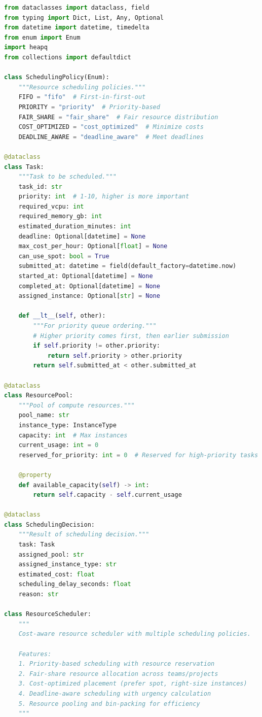 \begin{lstlisting}[language=Python, caption=ResourceScheduler with Cost-Aware Allocation]
from dataclasses import dataclass, field
from typing import Dict, List, Any, Optional
from datetime import datetime, timedelta
from enum import Enum
import heapq
from collections import defaultdict

class SchedulingPolicy(Enum):
    """Resource scheduling policies."""
    FIFO = "fifo"  # First-in-first-out
    PRIORITY = "priority"  # Priority-based
    FAIR_SHARE = "fair_share"  # Fair resource distribution
    COST_OPTIMIZED = "cost_optimized"  # Minimize costs
    DEADLINE_AWARE = "deadline_aware"  # Meet deadlines

@dataclass
class Task:
    """Task to be scheduled."""
    task_id: str
    priority: int  # 1-10, higher is more important
    required_vcpu: int
    required_memory_gb: int
    estimated_duration_minutes: int
    deadline: Optional[datetime] = None
    max_cost_per_hour: Optional[float] = None
    can_use_spot: bool = True
    submitted_at: datetime = field(default_factory=datetime.now)
    started_at: Optional[datetime] = None
    completed_at: Optional[datetime] = None
    assigned_instance: Optional[str] = None

    def __lt__(self, other):
        """For priority queue ordering."""
        # Higher priority comes first, then earlier submission
        if self.priority != other.priority:
            return self.priority > other.priority
        return self.submitted_at < other.submitted_at

@dataclass
class ResourcePool:
    """Pool of compute resources."""
    pool_name: str
    instance_type: InstanceType
    capacity: int  # Max instances
    current_usage: int = 0
    reserved_for_priority: int = 0  # Reserved for high-priority tasks

    @property
    def available_capacity(self) -> int:
        return self.capacity - self.current_usage

@dataclass
class SchedulingDecision:
    """Result of scheduling decision."""
    task: Task
    assigned_pool: str
    assigned_instance_type: str
    estimated_cost: float
    scheduling_delay_seconds: float
    reason: str

class ResourceScheduler:
    """
    Cost-aware resource scheduler with multiple scheduling policies.

    Features:
    1. Priority-based scheduling with resource reservation
    2. Fair-share resource allocation across teams/projects
    3. Cost-optimized placement (prefer spot, right-size instances)
    4. Deadline-aware scheduling with urgency calculation
    5. Resource pooling and bin-packing for efficiency
    """


\end{lstlisting}
